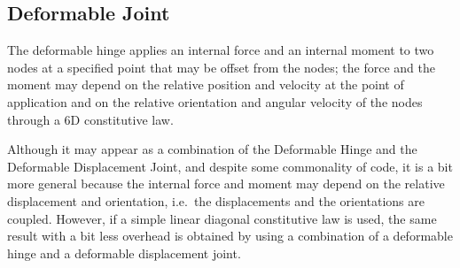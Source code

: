 \documentclass[10pt,dvips]{report}
\begin{document}
\subsection{Deformable Joint}
The deformable hinge applies an internal force and an internal moment
to two nodes at a specified point that may be offset from the nodes;
the force and the moment may depend on the relative position and velocity
at the point of application and on the relative orientation and angular 
velocity of the nodes through a 6D constitutive law.

Although it may appear as a combination of the Deformable Hinge
and the Deformable Displacement Joint, and despite some commonality
of code, it is a bit more general because the internal force
and moment may depend on the relative displacement and orientation,
i.e.\ the displacements and the orientations are coupled.
However, if a simple linear diagonal constitutive law is used,
the same result with a bit less overhead is obtained by using
a combination of a deformable hinge and a deformable displacement joint.
\end{document}
